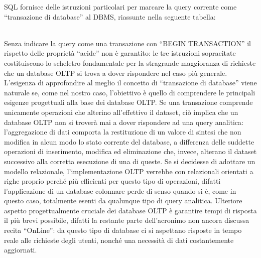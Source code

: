 \documentclass[a4paper,12pt]{report}
\begin{document}
SQL fornisce delle istruzioni particolari per marcare la query corrente come “transazione di database” al DBMS, riassunte nella seguente tabella:
\begin{table}[ht]
    \centering
    \caption{Istruzioni SQL per Transazioni}
    \label{tab:TransazioniSQL}
\end{table}
\\[1ex]
Senza indicare la query come una transazione con “BEGIN TRANSACTION” il rispetto delle proprietà “acide” non è garantito: le tre istruzioni sopracitate costituiscono lo scheletro fondamentale per la stragrande maggioranza di richieste che un database OLTP si trova a dover rispondere nel caso più generale.
L’esigenza di approfondire al meglio il concetto di “transazione di database” viene naturale se, come nel nostro caso, l’obiettivo è quello di comprendere le principali esigenze progettuali alla base dei database OLTP. Se una transazione comprende unicamente operazioni che alterino all’effettivo il dataset, ciò implica che un database OLTP non si troverà mai a dover rispondere ad una query analitica: l’aggregazione di dati comporta la restituzione di un valore di sintesi che non modifica in alcun modo lo stato corrente del database, a differenza delle suddette operazioni di inserimento, modifica ed eliminazione che, invece, alterano il dataset successivo alla corretta esecuzione di una di queste. Se si decidesse di adottare un modello relazionale, l’implementazione OLTP verrebbe con relazionali orientati a righe proprio perché più efficienti per questo tipo di operazioni, difatti l’applicazione di un database colonnare perde di senso quando si è, come in questo caso, totalmente esenti da qualunque tipo di query analitica. Ulteriore aspetto progettualmente cruciale dei database OLTP è garantire tempi di risposta il più brevi possibile, difatti la restante parte dell’acronimo non ancora discussa recita “OnLine”: da questo tipo di database ci si aspettano risposte in tempo reale alle richieste degli utenti, nonché una necessità di dati costantemente aggiornati.
\end{document}
